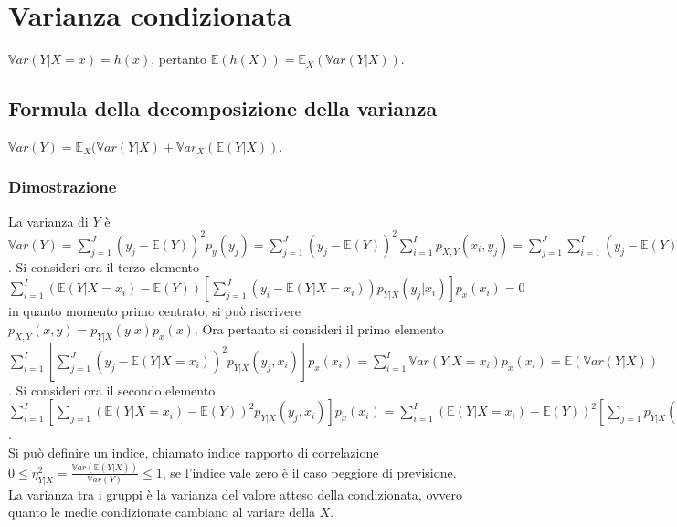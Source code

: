 \section{Varianza condizionata}
$\mathbb{V}ar(Y|X=x)=h(x)$, pertanto $\mathbb{E}(h(X))=\mathbb{E}_X(\mathbb{V}ar(Y|X))$.
\subsection{Formula della decomposizione della varianza}
$\mathbb{V}ar(Y)=\mathbb{E}_X(\mathbb{V}ar(Y|X)+\mathbb{V}ar_X(\mathbb{E}(Y|X))$.
\subsubsection{Dimostrazione}
La varianza di $Y$ \`e $\mathbb{V}ar(Y)=\sum\limits_{j=1}^J(y_j-\mathbb{E}(Y))^2p_y(y_j)=\sum\limits_{j=1}^J(y_j-\mathbb{E}(Y))^2\sum\limits_{i=1}^Ip_{X,Y}(x_i, y_j)=
\sum\limits_{j=1}^J\sum\limits_{i=1}^I(y_j-\mathbb{E}(Y))^2p_{X,Y}(x_i, y_j)=\sum\limits_{j=1}^J\sum\limits_{i=1}^I(y_j-\mathbb{E}(Y|X=x_i)+\mathbb{E}(Y|X=x_i)-\mathbb{E}
(Y))^2p_{X,Y}(x_i, y_j)=\sum\limits_{j=1}^J\sum\limits_{i=1}^I(y_j-\mathbb{E}(Y|X=x_i))^2p_{X,Y}(x_i, y_j)+\sum\limits_{j=1}^J\sum\limits_{i=1}^I(\mathbb{E}(Y|X=x_i)-\mathbb{E}
(Y))^2p_{X,Y}(x_i, y_j)+\sum\limits_{j=1}^J\sum\limits_{i=1}^I2(y_j-\mathbb{E}(Y|X=x_i))(\mathbb{E}(Y|X=x_i)-\mathbb{E}(Y))p_{X,Y}(x_i, y_j)$. Si consideri ora il terzo 
elemento $\sum\limits_{i=1}^I(\mathbb{E}(Y|X=x_i)-\mathbb{E}(Y))[\sum\limits_{j=1}^J(y_i-\mathbb{E}(Y|X=x_i))p_{Y|X}(y_j|x_i)]p_x(x_i)=0$ in quanto momento primo centrato, si 
pu\`o riscrivere $p_{X,Y}(x,y)=p_{Y|X}(y|x)p_x(x)$. Ora pertanto si consideri il primo elemento $\sum\limits_{i=1}^I[\sum\limits_{j=1}^J(y_j-\mathbb{E}(Y|X=x_i))^2p_{Y|X}(y_j, 
x_i)]p_x(x_i)=\sum\limits_{i=1}^I\mathbb{V}ar(Y|X=x_i)p_x(x_i)=\mathbb{E}(\mathbb{V}ar(Y|X))$. Si consideri ora il secondo elemento $\sum\limits_{i=1}^I[\sum\limits_{j=1}
(\mathbb{E}(Y|X=x_i)-\mathbb{E}(Y))^2p_{Y|X}(y_j,x_i)]p_x(x_i)=\sum\limits_{i=1}^I(\mathbb{E}(Y|X=x_i)-\mathbb{E}(Y))^2[\sum\limits_{j=1}p_{Y|X}(y_j,x_i)]p_x(x_i)=\sum
\limits_{i=1}^I(\mathbb{E}(Y|X=x_i)-\mathbb{E}(Y))^2p_x(x_i)=\mathbb{V}ar(\mathbb{E}(Y|X))$.\\
Si pu\`o definire un indice, chiamato indice rapporto di correlazione $0\le\eta^2_{Y|X}=\frac{\mathbb{V}ar(\mathbb{E}(Y|X))}{\mathbb{V}ar(Y)}\le 1$, se l'indice vale zero \`e
il caso peggiore di previsione.\\
La varianza tra i gruppi \`e la varianza del valore atteso della condizionata, ovvero quanto le medie condizionate cambiano al variare della $X$.